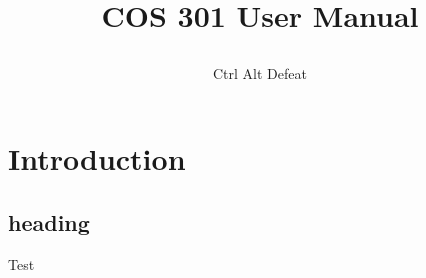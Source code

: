 \documentclass[12pt]{article}
\title{

\\
{COS 301 User Manual}
}
\author{Ctrl Alt Defeat}
\begin{document}
\section{Introduction}
\subsection{heading}
Test
\end{document}
